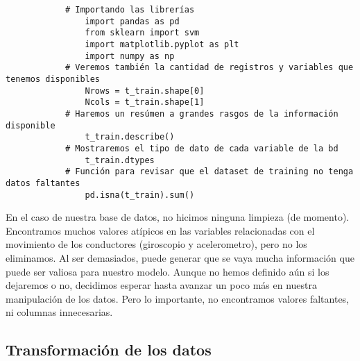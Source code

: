 \documentclass{article}
\begin{document}
        \begin{lstlisting}
            # Importando las librerías
                import pandas as pd
                from sklearn import svm
                import matplotlib.pyplot as plt
                import numpy as np
            # Veremos también la cantidad de registros y variables que tenemos disponibles
                Nrows = t_train.shape[0]
                Ncols = t_train.shape[1]
            # Haremos un resúmen a grandes rasgos de la información disponible
                t_train.describe()
            # Mostraremos el tipo de dato de cada variable de la bd
                t_train.dtypes
            # Función para revisar que el dataset de training no tenga datos faltantes
                pd.isna(t_train).sum()
        \end{lstlisting}

        En el caso de nuestra base de datos, no hicimos ninguna limpieza (de momento). Encontramos muchos valores atípicos en las variables relacionadas con el movimiento de los conductores (giroscopio y acelerometro), pero no los eliminamos. Al ser demasiados, puede generar que se vaya mucha información que puede ser valiosa para nuestro modelo. Aunque no hemos definido aún si los dejaremos o no, decidimos esperar hasta avanzar un poco más en nuestra manipulación de los datos. Pero lo importante, no encontramos valores faltantes, ni columnas innecesarias.
    

    \subsection{Transformación de los datos}
        
\end{document}

